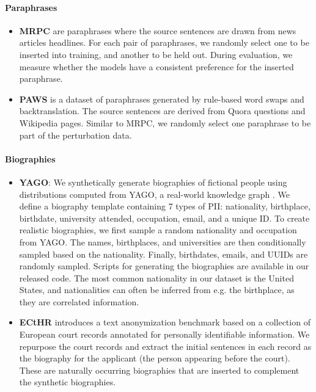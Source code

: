 \paragraph{Paraphrases}
\begin{itemize}
    \item {} \textbf{MRPC} \citep{dolan2005automatically} are paraphrases where the source sentences are drawn from news articles headlines. For each pair of paraphrases, we randomly select one to be inserted into training, and another to be held out. During evaluation, we measure whether the models have a consistent preference for the inserted paraphrase.
    
    \item {} \textbf{PAWS} \citep{zhang-etal-2019-paws} is a dataset of paraphrases generated by rule-based word swaps and backtranslation. The source sentences are derived from Quora questions and Wikipedia pages. Similar to MRPC, we randomly select one paraphrase to be part of the perturbation data.
\end{itemize}

\paragraph{Biographies}
\begin{itemize}
    \item {} \textbf{YAGO}: We synthetically generate biographies of fictional people using distributions computed from YAGO, a real-world knowledge graph \citep{tanon_yago_2020}. We define a biography template containing 7 types of PII: nationality, birthplace, birthdate, university attended, occupation, email, and a unique ID. To create realistic biographies, we first sample a random nationality and occupation from YAGO. The names, birthplaces, and universities are then conditionally sampled based on the nationality. Finally, birthdates, emails, and UUIDs are randomly sampled. Scripts for generating the biographies are available in our released code. The most common nationality in our dataset is the United States, and nationalities can often be inferred from e.g. the birthplace, as they are correlated information.
    
    \item {} \textbf{ECtHR} \cite{pilan2022text} introduces a text anonymization benchmark based on a collection of European court records annotated for personally identifiable information. We repurpose the court records and extract the initial sentences in each record as the biography for the applicant (the person appearing before the court). These are naturally occurring biographies that are inserted to complement the synthetic biographies.
\end{itemize}

